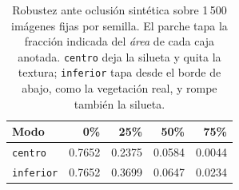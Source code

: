 \begin{table}[t]
  \centering
  \small
  \begin{tabular}{lrrrr}
    \toprule
    Modo & 0\% & 25\% & 50\% & 75\% \\
    \midrule
    \texttt{centro} & 0.7652 & 0.2375 & 0.0584 & 0.0044 \\
    \texttt{inferior} & 0.7652 & 0.3699 & 0.0647 & 0.0234 \\
    \bottomrule
  \end{tabular}
  \caption{Robustez ante oclusión sintética sobre 1\,500 imágenes fijas por semilla. El parche tapa la fracción indicada del \emph{área} de cada caja anotada. \texttt{centro} deja la silueta y quita la textura; \texttt{inferior} tapa desde el borde de abajo, como la vegetación real, y rompe también la silueta.}
  \label{tab:oclusion}
\end{table}
